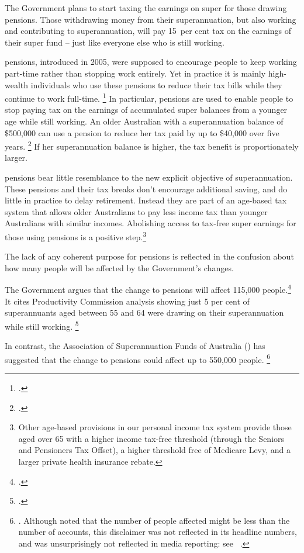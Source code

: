 \documentclass[continuous]{grattan}\usepackage[]{graphicx}\usepackage[]{color}
\begin{document}
The Government plans to start taxing the earnings on super for those drawing \TTR{} pensions. 
Those withdrawing money from their superannuation, but also working and contributing to superannuation, will pay 15~per cent tax on the earnings of their super fund -- just like everyone else who is still working.

\TTR{} pensions, introduced in 2005, were supposed to encourage people to keep working part-time rather than stopping work entirely.
Yet in practice it is mainly high-wealth individuals who use these pensions to reduce their tax bills while they continue to work full-time.%
\footcite{ProductivityCommission2015SuperPolicyPostRetirement} %
In particular, \TTR{} pensions are used to enable people to stop paying tax on the earnings of accumulated super balances from a younger age while still working. 
An older Australian with a superannuation balance of \$500,000 can use a \TTR{} pension to reduce her tax paid by up to \$40,000 over five years.%
\footcite{Daley-Coates-theConvo-TaxFree-Super-Intergen-theft} %
If her superannuation balance is higher, the tax benefit is proportionately larger.

\TTR{} pensions bear little resemblance to the new explicit objective of superannuation.
These pensions and their tax breaks don't encourage additional saving, 
and do little in practice to delay retirement.
Instead they are part of an age-based tax system that allows older Australians to pay less income tax than younger Australians with similar incomes.
Abolishing access to tax-free super earnings for those using \TTR{} pensions is a positive step.\footnote{%
Other age-based provisions in our personal income tax system provide those aged over 65 with a higher income tax-free threshold (through the Seniors and Pensioners Tax Offset), a higher threshold free of Medicare Levy, and a larger private health insurance rebate.%
} %

The lack of any coherent purpose for \TTR{} pensions is reflected in the confusion about how many people will be affected by the Government’s changes. 

The Government argues that the change to \TTR{} pensions will affect 115,000 people.\footcite{TurnbullMorrison-2016-doorstop-115k-affected-by-super} %
It cites Productivity Commission analysis showing just 5 per cent of superannuants aged between 55 and 64 were drawing on their superannuation while still working.%
\footcite[][144]{ProductivityCommission2015SuperPolicyPostRetirement}

In contrast, the Association of Superannuation Funds of Australia (\ASFA{}) has suggested that the change to \TTR{} pensions could affect up to 550,000 people.%
\footnote{\textcite{ASFA-2016-Individuals-affected-by-budget-measures}. %
Although \ASFA{} noted that the number of people affected might be less than the number of accounts, this disclaimer was not reflected in its headline numbers, and was unsurprisingly not reflected in media reporting: see \eg~\textcites{Carney-2016-theHeraldSun-Super-debate-nobody-can-be-frank}{AFR-2016-Election-Super-changes-to-hit-1-3M}.}
\end{document}
